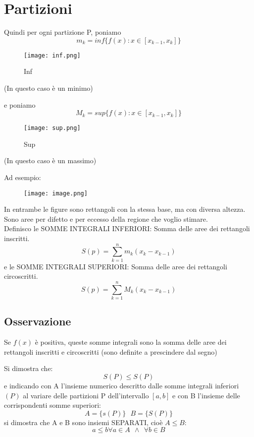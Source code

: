 \documentclass[../../main.tex]{subfiles}
\begin{document}
\section{Partizioni}
Quindi per ogni partizione P, poniamo\[m_k = inf\{f(x):x\in [x_{k-1}, x_k]\}\]

\begin{figure}[ht]
    \centering
    \texttt{[image: inf.png]}
    \caption{Inf}
    \label{fig:inf}
\end{figure}

(In questo caso è un minimo)

e poniamo\[M_k = sup\{f(x):x\in[x_{k-1}, x_k]\}\]

\begin{figure}[!ht]
    \centering
    \texttt{[image: sup.png]}
    \caption{Sup}\label{fig:sup}
\end{figure}

(In questo caso è un massimo)

\newpage

Ad esempio:
\begin{figure}[ht]
    \centering
    \texttt{[image: image.png]}\label{fig:supinf}
\end{figure}

\vspace{10pt}
In entrambe le figure sono rettangoli con la stessa base, ma con diversa
altezza. Sono aree per difetto e per eccesso della regione che voglio stimare.\\
Definisco le SOMME INTEGRALI INFERIORI: Somma delle aree dei rettangoli
inscritti.\[S(p) = \sum_{k=1}^{n}m_k(x_k-x_{k-1})\]
e le SOMME INTEGRALI SUPERIORI: Somma delle aree dei rettangoli circoscritti.
\[S(p) = \sum_{k=1}^{n}M_k(x_k-x_{k-1})\]

\subsection{Osservazione}
Se $f(x)$ è positiva, queste somme integrali sono la somma delle aree dei
rettangoli inscritti e circoscritti (sono definite a prescindere dal segno)

Si dimostra che:\[S(P) \leq S(P)\] e indicando con A l'insieme numerico descritto dalle somme integrali inferiori
$(P)$ al variare delle partizioni P dell'intervallo $[a, b]$ e con B l'insieme
delle corrispondenti somme superiori:\[A = \{s(P)\} \ \ \ B=\{S(P)\}\] si dimostra che A e B sono insiemi SEPARATI, cioè $A\leq B$:\[a\leq b \forall a\in A \ \ \land \ \ \forall b \in
    B\]
\end{document}
